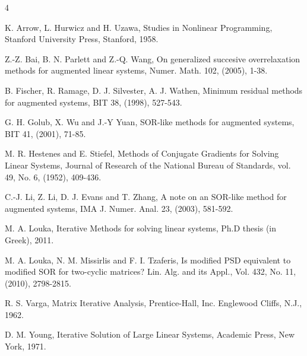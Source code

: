 \documentclass{report}
\begin{document}
\noindent
\begin{thebibliography}{4}

 K. Arrow, L. Hurwicz and H. Uzawa, Studies in
Nonlinear Programming, Stanford University Press, Stanford, 1958.

 Z.-Z. Bai, B. N. Parlett and Z.-Q. Wang, On
generalized succesive overrelaxation methods for augmented linear
systems, Numer. Math. 102, (2005), 1-38.




 B. Fischer, R. Ramage, D. J. Silvester, A. J.
Wathen, Minimum residual methods for augmented systems, BIT 38, (1998),
527-543.


 G. H. Golub, X. Wu and J.-Y Yuan, SOR-like
methods for augmented systems, BIT 41, (2001), 71-85.


 M. R. Hestenes and E. Stiefel, Methods of Conjugate
Gradients for Solving Linear Systems, Journal of Research of the National
Bureau of Standards, vol. 49, No. 6, (1952), 409-436.


 C.-J. Li, Z. Li, D. J. Evans and T. Zhang, A
note on an SOR-like method for augmented
systems, IMA J. Numer. Anal. 23, (2003), 581-592.

 M. A. Louka, Iterative Methods for solving linear
systems, Ph.D thesis (in Greek), 2011.

 M. A. Louka, N. M. Missirlis and F. I. Tzaferis, Is
modified PSD equivalent to modified SOR for two-cyclic matrices? Lin.
Alg. and its Appl., Vol. 432, No. 11, (2010), 2798-2815.


 R. S. Varga, Matrix Iterative Analysis, Prentice-Hall, Inc.
Englewood Cliffs, N.J., 1962.





 D. M. Young, Iterative Solution of Large Linear Systems,
Academic Press, New York, 1971.

\end{thebibliography}
\end{document}

